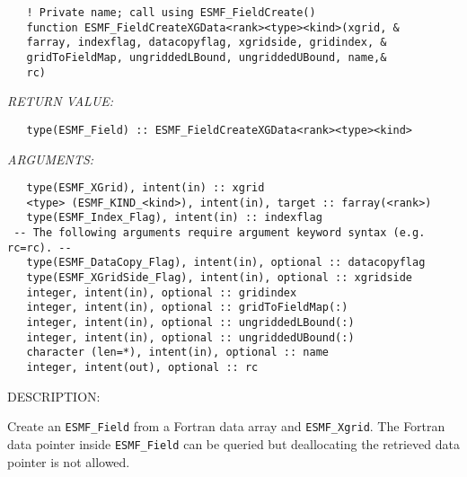    
\begin{verbatim}   ! Private name; call using ESMF_FieldCreate() 
   function ESMF_FieldCreateXGData<rank><type><kind>(xgrid, & 
   farray, indexflag, datacopyflag, xgridside, gridindex, & 
   gridToFieldMap, ungriddedLBound, ungriddedUBound, name,& 
   rc) 
   \end{verbatim}{\em RETURN VALUE:}
\begin{verbatim}   type(ESMF_Field) :: ESMF_FieldCreateXGData<rank><type><kind> 
   \end{verbatim}{\em ARGUMENTS:}
\begin{verbatim}   type(ESMF_XGrid), intent(in) :: xgrid 
   <type> (ESMF_KIND_<kind>), intent(in), target :: farray(<rank>) 
   type(ESMF_Index_Flag), intent(in) :: indexflag 
 -- The following arguments require argument keyword syntax (e.g. rc=rc). --
   type(ESMF_DataCopy_Flag), intent(in), optional :: datacopyflag 
   type(ESMF_XGridSide_Flag), intent(in), optional :: xgridside 
   integer, intent(in), optional :: gridindex 
   integer, intent(in), optional :: gridToFieldMap(:) 
   integer, intent(in), optional :: ungriddedLBound(:) 
   integer, intent(in), optional :: ungriddedUBound(:) 
   character (len=*), intent(in), optional :: name 
   integer, intent(out), optional :: rc 
   \end{verbatim}
{\sf DESCRIPTION:\\ }

 
   Create an {\tt ESMF\_Field} from a Fortran data array and {\tt ESMF\_Xgrid}. 
   The Fortran data pointer inside {\tt ESMF\_Field} can be queried but deallocating 
   the retrieved data pointer is not allowed. 
   
